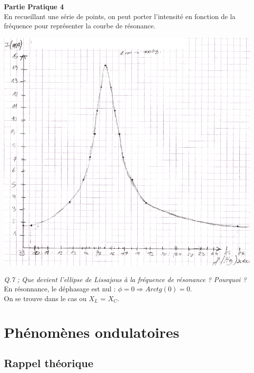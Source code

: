 \documentclass	[11pt, a4paper, openany]{book}
\begin{document}
\textbf{Partie Pratique 4}\\
En recueillant une série de points, on peut porter l'intensité en fonction de la fréquence pour représenter la courbe de résonance.
\begin{center}
\includegraphics[scale=0.5]{labo/image35.png}
\end{center}
\textit{Q.7 ; Que devient l'ellipse de Lissajous à la fréquence de résonance ? Pourquoi ?}\\
En résonnance, le déphasage est nul : $\phi = 0 \Rightarrow Arctg(0) = 0$.\\
On se trouve dans le cas ou $X_L$ = $X_C$.













\newpage
\section{Phénomènes ondulatoires}
\subsection{Rappel théorique}
\end{document}
